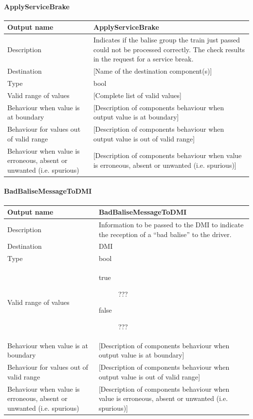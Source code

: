 \paragraph{ApplyServiceBrake}

\begin{longtable}{p{}p{}}
\toprule
Output name				& ApplyServiceBrake \\
\midrule
Description				&  Indicates if the balise group the train just passed could not be processed correctly. The check results in the request for a service break. \\
\midrule
Destination				& [Name of the destination component(s)] \\ 
\midrule
Type					& bool \\
\midrule
Valid range of values	& [Complete list of valid values] \\
\midrule
Behaviour when value is at boundary	& [Description of components behaviour when output value is at boundary] \\
\midrule
Behaviour for values out of valid range	& [Description of components behaviour when output value is out of valid range] \\
\midrule
Behaviour when value is erroneous, absent or unwanted (i.e. spurious) & [Description of components behaviour when value is erroneous, absent or unwanted (i.e. spurious)] \\
\bottomrule
\end{longtable}


\paragraph{BadBaliseMessageToDMI}

\begin{longtable}{p{}p{}}
\toprule
Output name				& BadBaliseMessageToDMI \\
\midrule
Description				& Information to be passed to the DMI to indicate the reception of a ``bad balise'' to the driver. \\
\midrule
Destination				& DMI \\ 
\midrule
Type					& bool \\
\midrule
Valid range of values	& \begin{description}
\item[true] ???
\item[false] ???
\end{description} \\
\midrule
Behaviour when value is at boundary	& [Description of components behaviour when output value is at boundary] \\
\midrule
Behaviour for values out of valid range	& [Description of components behaviour when output value is out of valid range] \\
\midrule
Behaviour when value is erroneous, absent or unwanted (i.e. spurious) & [Description of components behaviour when value is erroneous, absent or unwanted (i.e. spurious)] \\
\bottomrule
\end{longtable}


